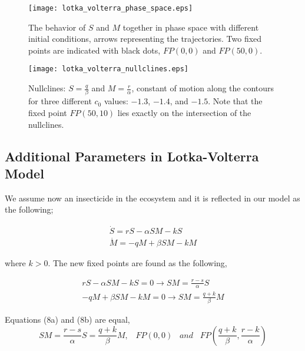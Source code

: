 \documentclass[12pt]{article}
\begin{document}
\begin{figure}[h!]
	\centering
	\texttt{[image: lotka\_volterra\_phase\_space.eps]}
		\caption{The behavior of $S$ and $M$ together in phase space with different initial conditions, arrows representing the trajectories. Two fixed points are indicated with black dots, $FP(0,0)$ and $FP(50,0)$.}
\end{figure}

\begin{figure}[h!]
	\centering
	\texttt{[image: lotka\_volterra\_nullclines.eps]}
		\caption{Nullclines: $S=\frac{q}{\beta}$ and $M=\frac{r}{\alpha}$, constant of motion along the contours for three different $c_0$ values: $-1.3$, $-1.4$, and $-1.5$. Note that the fixed point $FP(50,10)$ lies exactly on the intersection of the nullclines.}
\end{figure}

\subsection{Additional Parameters in Lotka-Volterra Model}

We assume now an insecticide in the ecosystem and it is reflected in our model as the following;

\begin{subequations}
 \begin{align}\dot{S} = rS - \alpha SM  -kS \label{eqn: frobenius 1}\\  \dot{M} = -qM + \beta SM -kM \label{eqn: frobenius 2} 
 \end{align} 
\end{subequations}

where $k>0$. The new fixed points are found as the following,

\begin{subequations}
 \begin{align} rS - \alpha SM  -kS = 0 \longrightarrow SM = \frac{r-s}{\alpha} S
  \label{eqn: frobenius 1}\\  -qM + \beta SM -kM  = 0 \longrightarrow SM = \frac{q+k}{\beta} M
   \label{eqn: frobenius 2} 
 \end{align} 
\end{subequations}

Equations (8a) and (8b) are equal,
\begin{equation}
 SM = \frac{r-s}{\alpha} S = \frac{q+k}{\beta} M , \;\;\; FP(0, 0) \;\;\; and \;\;\; FP(\frac{q+k}{\beta} , \frac{r-k}{\alpha})
\end{equation}
\end{document}
